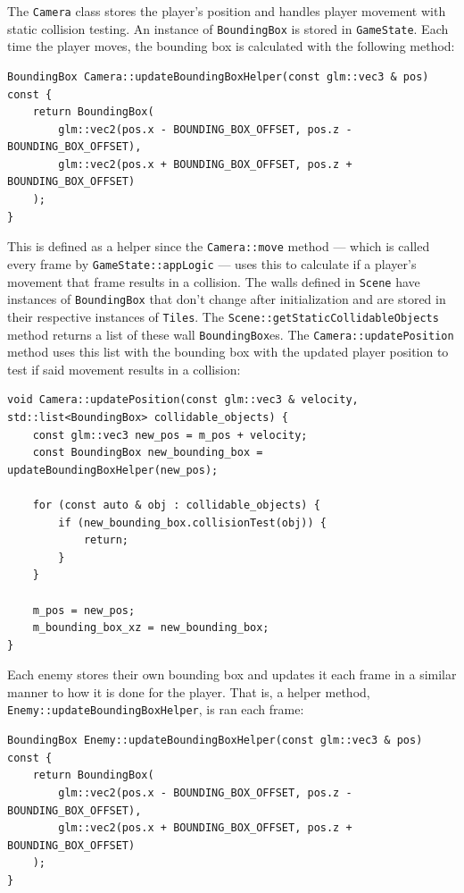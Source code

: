 \documentclass {article}
\begin{document}
The \texttt{Camera} class stores the player's position and handles player movement with static collision testing. An instance of \texttt{BoundingBox} is stored in \texttt{GameState}. Each time the player moves, the bounding box is calculated with the following method:
\begin{verbatim}
BoundingBox Camera::updateBoundingBoxHelper(const glm::vec3 & pos) const {
    return BoundingBox(
        glm::vec2(pos.x - BOUNDING_BOX_OFFSET, pos.z - BOUNDING_BOX_OFFSET),
        glm::vec2(pos.x + BOUNDING_BOX_OFFSET, pos.z + BOUNDING_BOX_OFFSET)
    );
}
\end{verbatim}
This is defined as a helper since the \texttt{Camera::move} method --- which is called every frame by \texttt{GameState::appLogic} --- uses this to calculate if a player's movement that frame results in a collision. The walls defined in \texttt{Scene} have instances of \texttt{BoundingBox} that don't change after initialization and are stored in their respective instances of \texttt{Tiles}. The \texttt{Scene::getStaticCollidableObjects} method returns a list of these wall \texttt{BoundingBox}es. The \texttt{Camera::updatePosition} method uses this list with the bounding box with the updated player position to test if said movement results in a collision:
\begin{verbatim}
void Camera::updatePosition(const glm::vec3 & velocity, std::list<BoundingBox> collidable_objects) {
    const glm::vec3 new_pos = m_pos + velocity;
    const BoundingBox new_bounding_box = updateBoundingBoxHelper(new_pos);

    for (const auto & obj : collidable_objects) {
        if (new_bounding_box.collisionTest(obj)) {
            return;
        }
    }

    m_pos = new_pos;
    m_bounding_box_xz = new_bounding_box;
}
\end{verbatim}

Each enemy stores their own bounding box and updates it each frame in a similar manner to how it is done for the player. That is, a helper method, \texttt{Enemy::updateBoundingBoxHelper}, is ran each frame:
\begin{verbatim}
BoundingBox Enemy::updateBoundingBoxHelper(const glm::vec3 & pos) const {
    return BoundingBox(
        glm::vec2(pos.x - BOUNDING_BOX_OFFSET, pos.z - BOUNDING_BOX_OFFSET),
        glm::vec2(pos.x + BOUNDING_BOX_OFFSET, pos.z + BOUNDING_BOX_OFFSET)
    );
}
\end{verbatim}
\end{document}
